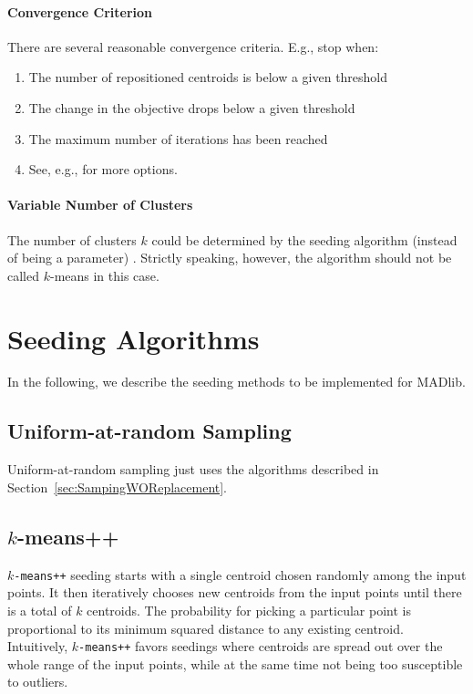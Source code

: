 \paragraph{Convergence Criterion}

There are several reasonable convergence criteria. E.g., stop when:
\begin{enumerate}
	\item The number of repositioned centroids is below a given threshold
	\item The change in the objective drops below a given threshold
	\item The maximum number of iterations has been reached
	\item See, e.g., \textcite[Section~16.4]{CS08a} for more options.
\end{enumerate}

\paragraph{Variable Number of Clusters}

The number of clusters $k$ could be determined by the seeding algorithm (instead of being a parameter) \cite{MNU00a}. Strictly speaking, however, the algorithm should not be called $k$-means in this case.


\section{Seeding Algorithms}

In the following, we describe the seeding methods to be implemented for MADlib.

\subsection{Uniform-at-random Sampling}

Uniform-at-random sampling just uses the algorithms described in Section~\ref{sec:SampingWOReplacement}.

\subsection[k-means++]{$k$-means++}

\texttt{$k$-means++} seeding \cite{AV07a} starts with a single centroid chosen randomly among the input points. It then iteratively chooses new centroids from the input points until there is a total of $k$ centroids. The probability for picking a particular point is proportional to its minimum squared distance to any existing centroid. Intuitively, \texttt{$k$-means++} favors seedings where centroids are spread out over the whole range of the input points, while at the same time not being too susceptible to outliers.

